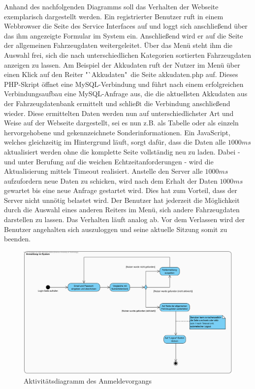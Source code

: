 \documentclass[fontsize = 12pt, paper = a4]{scrreprt}
\begin{document}
Anhand des nachfolgenden Diagramms soll das Verhalten der Webseite exemplarisch dargestellt werden. Ein registrierter Benutzer ruft in einem Webbrowser die Seite des Service Interfaces auf und loggt sich anschließend über das ihm angezeigte Formular im System ein. Anschließend wird er auf die Seite der allgemeinen Fahrzeugdaten weitergeleitet. Über das Menü steht ihm die Auswahl frei, sich die nach unterschiedlichen Kategorien sortierten Fahrzeugdaten anzeigen zu lassen. Am Beispiel der Akkudaten ruft der Nutzer im Menü über einen Klick auf den Reiter "`Akkudaten"\ die Seite akkudaten.php auf. Dieses PHP-Skript öffnet eine MySQL-Verbindung und führt nach einem erfolgreichen Verbindungsaufbau eine MySQL-Anfrage aus, die die aktuellsten Akkudaten aus der Fahrzeugdatenbank ermittelt und schließt die Verbindung anschließend wieder. Diese ermittelten Daten werden nun auf unterschiedlichster Art und Weise auf der Webseite dargestellt, sei es nun z.B. als Tabelle oder als einzeln hervorgehobene und gekennzeichnete Sonderinformationen.
Ein JavaScript, welches gleichzeitig im Hintergrund läuft, sorgt dafür, dass die Daten alle $1000 ms$ aktualisiert werden ohne die komplette Seite vollständig neu zu laden. Dabei - und unter Berufung auf die weichen Echtzeitanforderungen - wird die Aktualisierung mittels Timeout realisiert. Anstelle den Server alle $1000 ms$ aufzufordern neue Daten zu schicken, wird nach dem Erhalt der Daten $1000 ms$ gewartet bis eine neue Anfrage gestartet wird. Dies hat zum Vorteil, dass der Server nicht unnötig belastet wird.
Der Benutzer hat jederzeit die Möglichkeit durch die Auswahl eines anderen Reiters im Menü, sich andere Fahrzeugdaten darstellen zu lassen. Das Verhalten läuft analog ab. Vor dem Verlassen wird der Benutzer angehalten sich auszuloggen und seine aktuelle Sitzung somit zu beenden. \\



\begin{figure}[h]
\centering
\includegraphics[scale = 0.6]{anmeldungsvorgang}
\caption[Aktivitätsdiagramm Anmeldevorgang]{Aktivitätsdiagramm des Anmeldevorgangs}
\end{figure}
\end{document}
